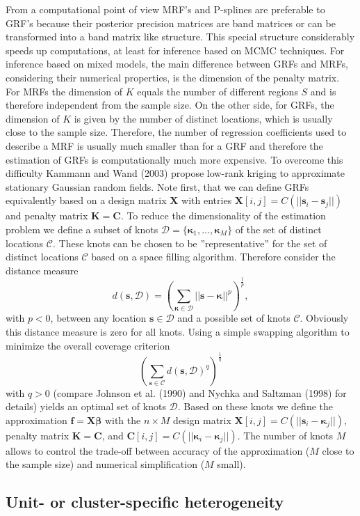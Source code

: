 \documentclass[11pt,a4paper,twoside]{bayesxarticle}
\def \Kvec {\vec{K}}
\def \betavec {\boldsymbol{\beta}}
\def \kappavec {\boldsymbol{\kappa}}
\def \fvec {\mathbf{f}}
\def \svec {\mathbf{s}}
\def \Cvec {\mathbf{C}}
\def \Kvec {\mathbf{K}}
\def \svec {\mathbf{s}}
\def \Cvec {\mathbf{C}}
\def \Xvec {\mathbf{X}}
\begin{document}
From a computational point of view MRF's and P-splines are
preferable to GRF's because their posterior precision matrices are
band matrices or can be transformed into a band matrix like
structure. This special structure considerably speeds up
computations, at least for inference based on MCMC techniques. For
inference based on mixed models, the main difference between GRFs
and MRFs, considering their numerical properties, is the dimension
of the penalty matrix. For MRFs the dimension of $K$ equals the
number of different regions $S$ and is therefore independent from
the sample size. On the other side, for GRFs, the dimension of $K$
is given by the number of distinct locations, which is usually close
to the sample size. Therefore, the number of regression coefficients
used to describe a MRF is usually much smaller than for a GRF and
therefore the estimation of GRFs is computationally much more
expensive. To overcome this difficulty Kammann and Wand (2003)
propose low-rank kriging to approximate stationary Gaussian random
fields. Note first, that we can define GRFs equivalently based on a
design matrix $\Xvec$ with entries
$\Xvec[i,j]=C(||\svec_i-\svec_j||)$ and penalty matrix
$\Kvec=\Cvec$. To reduce the dimensionality of the estimation
problem we define a subset of knots
$\mathcal{D}=\{\kappavec_1,\ldots,\kappavec_M\}$ of the set of
distinct locations $\mathcal{C}$. These knots can be chosen to be
''representative'' for the set of distinct locations $\mathcal{C}$
based on a space filling algorithm. Therefore consider the distance
measure
\[d(\svec,\mathcal{D})=\left(\sum_{\kappavec\in\mathcal{D}}||\svec-\kappavec||^p\right)^{\frac{1}{p}},\]
with $p<0$, between any location $\svec\in\mathcal{D}$ and a
possible set of knots $\mathcal{C}$. Obviously this distance measure
is zero for all knots. Using a simple swapping algorithm to minimize
the overall coverage criterion
\[\left(\sum_{\svec\in\mathcal{C}}d(\svec,\mathcal{D})^q\right)^{\frac{1}{q}}\]
with $q>0$ (compare Johnson et al. (1990) and Nychka and Saltzman
(1998) for details) yields an optimal set of knots $\mathcal{D}$.
Based on these knots we define the approximation
$\fvec=\Xvec\betavec$ with the $n\times M$ design matrix
$\Xvec[i,j]=C(||\svec_i-\kappavec_j||)$, penalty matrix
$\Kvec=\Cvec$, and $\Cvec[i,j]=C(||\kappavec_i-\kappavec_j||)$. The
number of knots $M$ allows to control the trade-off between accuracy
of the approximation ($M$ close to the sample size) and numerical
simplification ($M$ small).

\subsection{Unit- or cluster-specific heterogeneity}
\label{random}
\end{document}
